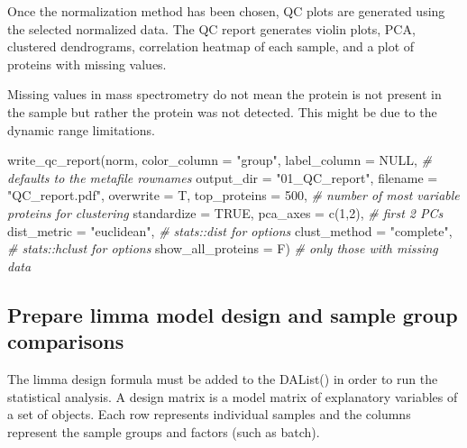 \documentclass[
]{article}
\newenvironment{Shaded}{\begin{snugshade}}{\end{snugshade}}
\newcommand{\AttributeTok}[1]{\textcolor[rgb]{0.77,0.63,0.00}{#1}}
\newcommand{\CommentTok}[1]{\textcolor[rgb]{0.56,0.35,0.01}{\textit{#1}}}
\newcommand{\ConstantTok}[1]{\textcolor[rgb]{0.00,0.00,0.00}{#1}}
\newcommand{\DecValTok}[1]{\textcolor[rgb]{0.00,0.00,0.81}{#1}}
\newcommand{\FunctionTok}[1]{\textcolor[rgb]{0.00,0.00,0.00}{#1}}
\newcommand{\NormalTok}[1]{#1}
\newcommand{\StringTok}[1]{\textcolor[rgb]{0.31,0.60,0.02}{#1}}
\begin{document}
Once the normalization method has been chosen, QC plots are generated
using the selected normalized data. The QC report generates violin
plots, PCA, clustered dendrograms, correlation heatmap of each sample,
and a plot of proteins with missing values.

Missing values in mass spectrometry do not mean the protein is not
present in the sample but rather the protein was not detected. This
might be due to the dynamic range limitations.

\begin{Shaded}
\begin{Highlighting}[]
\FunctionTok{write\_qc\_report}\NormalTok{(norm,}
                \AttributeTok{color\_column =} \StringTok{"group"}\NormalTok{,}
                \AttributeTok{label\_column =} \ConstantTok{NULL}\NormalTok{,        }\CommentTok{\# defaults to the metafile rownames}
                \AttributeTok{output\_dir =} \StringTok{"01\_QC\_report"}\NormalTok{,}
                \AttributeTok{filename =} \StringTok{"QC\_report.pdf"}\NormalTok{,}
                \AttributeTok{overwrite =}\NormalTok{ T,}
                \AttributeTok{top\_proteins =} \DecValTok{500}\NormalTok{,         }\CommentTok{\# number of most variable proteins for clustering}
                \AttributeTok{standardize =} \ConstantTok{TRUE}\NormalTok{,}
                \AttributeTok{pca\_axes =} \FunctionTok{c}\NormalTok{(}\DecValTok{1}\NormalTok{,}\DecValTok{2}\NormalTok{),          }\CommentTok{\# first 2 PCs}
                \AttributeTok{dist\_metric =} \StringTok{"euclidean"}\NormalTok{,  }\CommentTok{\# stats::dist for options}
                \AttributeTok{clust\_method =} \StringTok{"complete"}\NormalTok{,  }\CommentTok{\# stats::hclust for options}
                \AttributeTok{show\_all\_proteins =}\NormalTok{ F)  }\CommentTok{\# only those with missing data}
\end{Highlighting}
\end{Shaded}

\hypertarget{prepare-limma-model-design-and-sample-group-comparisons}{%
\subsection{Prepare limma model design and sample group
comparisons}\label{prepare-limma-model-design-and-sample-group-comparisons}}

The limma design formula must be added to the DAList() in order to run
the statistical analysis. A design matrix is a model matrix of
explanatory variables of a set of objects. Each row represents
individual samples and the columns represent the sample groups and
factors (such as batch).
\end{document}
